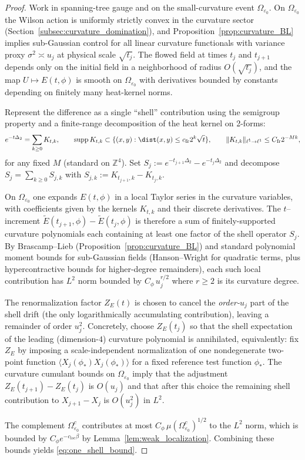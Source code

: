 \begin{proof}
Work in spanning-tree gauge and on the small-curvature event $\Omega_{\varepsilon_0}$.
On $\Omega_{\varepsilon_0}$ the Wilson action is uniformly strictly convex in the curvature sector (Section~\ref{subsec:curvature_domination}),
and Proposition~\ref{prop:curvature_BL} implies sub-Gaussian control for all linear curvature functionals with variance proxy
$\sigma^2\asymp u_j$ at physical scale $\sqrt{t_j}$.
The flowed field at times $t_j$ and $t_{j+1}$ depends only on the initial field in a neighborhood of radius $O(\sqrt{t_j})$,
and the map $U\mapsto E(t,\phi)$ is smooth on $\Omega_{\varepsilon_0}$ with derivatives bounded by constants depending on finitely many
heat-kernel norms.

Represent the difference as a single ``shell'' contribution using the semigroup property and a finite-range decomposition of the heat kernel
on 2-forms:
\begin{equation}\label{eq:finite_range_decomp}
 e^{-t\Delta_2}=\sum_{k\ge 0} K_{t,k},\qquad
 \mathrm{supp}\,K_{t,k}\subset\{(x,y):\dist(x,y)\le c_{\mathrm{fr}}2^k\sqrt t\},\qquad
 \|K_{t,k}\|_{\ell^1\to\ell^1}\le C_{\mathrm{fr}}2^{-Mk},
\end{equation}
for any fixed $M$ (standard on $\mathbb Z^4$).
Set $S_j:=e^{-t_{j+1}\Delta_2}-e^{-t_j\Delta_2}$ and decompose $S_j=\sum_{k\ge 0}S_{j,k}$ with $S_{j,k}:=K_{t_{j+1},k}-K_{t_j,k}$.

On $\Omega_{\varepsilon_0}$ one expands $E(t,\phi)$ in a local Taylor series in the curvature variables,
with coefficients given by the kernels $K_{t,k}$ and their discrete derivatives.
The $t$--increment $\widetilde E(t_{j+1},\phi)-\widetilde E(t_j,\phi)$ is therefore a sum of finitely-supported curvature polynomials
each containing at least one factor of the shell operator $S_j$.
By Brascamp--Lieb (Proposition~\ref{prop:curvature_BL}) and standard polynomial moment bounds for sub-Gaussian fields
(Hanson--Wright for quadratic terms, plus hypercontractive bounds for higher-degree remainders),
each such local contribution has $L^2$ norm bounded by $C_\phi\,u_j^{r/2}$ where $r\ge 2$ is its curvature degree.

The renormalization factor $Z_E(t)$ is chosen to cancel the \emph{order-$u_j$} part of the shell drift (the only logarithmically
accumulating contribution), leaving a remainder of order $u_j^2$.
Concretely, choose $Z_E(t_j)$ so that the shell expectation of the leading (dimension-$4$) curvature polynomial is annihilated,
equivalently: fix $Z_E$ by imposing a scale-independent normalization of one nondegenerate two-point function
$\langle X_j(\phi_*)X_j(\phi_*)\rangle$ for a fixed reference test function $\phi_*$.
The curvature cumulant bounds on $\Omega_{\varepsilon_0}$ imply that the adjustment $Z_E(t_{j+1})-Z_E(t_j)$ is $O(u_j)$ and that after this
choice the remaining shell contribution to $X_{j+1}-X_j$ is $O(u_j^2)$ in $L^2$.

The complement $\Omega_{\varepsilon_0}^c$ contributes at most $C_\phi\,\mu(\Omega_{\varepsilon_0}^c)^{1/2}$ to the $L^2$ norm,
which is bounded by $C_\phi e^{-c_{\mathrm{loc}}\beta}$ by Lemma~\ref{lem:weak_localization}.
Combining these bounds yields \eqref{eq:one_shell_bound}.
\end{proof}

